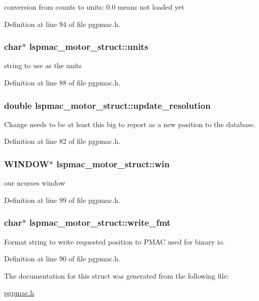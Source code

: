 conversion from counts to units: 0.0 means not loaded yet 

Definition at line 94 of file pgpmac.h.\hypertarget{structlspmac__motor__struct_a82bceff2ae698b4b9618360b446aec08}{
\subsubsection[{units}]{\setlength{\rightskip}{0pt plus 5cm}char$\ast$ {\bf lspmac\_\-motor\_\-struct::units}}}
\label{structlspmac__motor__struct_a82bceff2ae698b4b9618360b446aec08}


string to use as the units 

Definition at line 88 of file pgpmac.h.\hypertarget{structlspmac__motor__struct_a18386126b724d9c7f72364db126f5b93}{
\subsubsection[{update\_\-resolution}]{\setlength{\rightskip}{0pt plus 5cm}double {\bf lspmac\_\-motor\_\-struct::update\_\-resolution}}}
\label{structlspmac__motor__struct_a18386126b724d9c7f72364db126f5b93}


Change needs to be at least this big to report as a new position to the database. 

Definition at line 82 of file pgpmac.h.\hypertarget{structlspmac__motor__struct_a133775154b0e008f3a2fde6f53bc0eff}{
\subsubsection[{win}]{\setlength{\rightskip}{0pt plus 5cm}WINDOW$\ast$ {\bf lspmac\_\-motor\_\-struct::win}}}
\label{structlspmac__motor__struct_a133775154b0e008f3a2fde6f53bc0eff}


our ncurses window 

Definition at line 99 of file pgpmac.h.\hypertarget{structlspmac__motor__struct_a70291ddfe7994c0bec7fc2287cb6dd89}{
\subsubsection[{write\_\-fmt}]{\setlength{\rightskip}{0pt plus 5cm}char$\ast$ {\bf lspmac\_\-motor\_\-struct::write\_\-fmt}}}
\label{structlspmac__motor__struct_a70291ddfe7994c0bec7fc2287cb6dd89}


Format string to write requested position to PMAC used for binary io. 

Definition at line 90 of file pgpmac.h.

The documentation for this struct was generated from the following file:\begin{DoxyCompactItemize}
\item 
\hyperlink{pgpmac_8h}{pgpmac.h}\end{DoxyCompactItemize}
